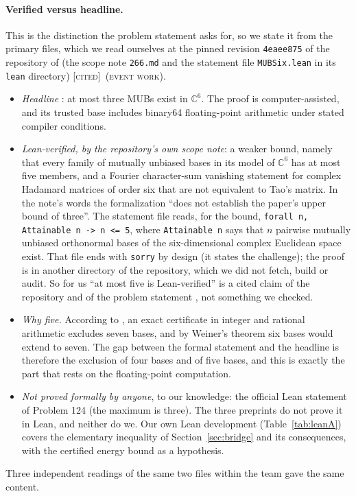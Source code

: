 \documentclass[11pt]{article}
\newcommand{\C}{\mathbb{C}}
\newcommand{\st}[1]{\textsc{[#1]}}
\newcommand{\stcited}{\st{cited}}
\newcommand{\event}{\textsc{(event work)}}
\theoremstyle{definition}
\theoremstyle{remark}
\begin{document}
\paragraph{Verified versus headline.} This is the distinction the problem statement asks for, so we state it from
the primary files, which we read ourselves at the pinned revision \texttt{4eaee875} of the repository of \cite{OAI}
(the scope note \texttt{266.md} and the statement file \texttt{MUBSix.lean} in its \texttt{lean} directory)
\stcited\ \event.
\begin{itemize}
\item \emph{Headline} \cite{OAI}: at most three MUBs exist in $\C^6$. The proof is computer-assisted, and its
trusted base includes binary64 floating-point arithmetic under stated compiler conditions.
\item \emph{Lean-verified, by the repository's own scope note}: a weaker bound, namely that every family of
mutually unbiased bases in its model of $\C^6$ has at most five members, and a Fourier character-sum vanishing
statement for complex Hadamard matrices of order six that are not equivalent to Tao's matrix. In the note's words
the formalization ``does not establish the paper's upper bound of three''. The statement file reads, for the bound,
\texttt{forall n, Attainable n -> n <= 5}, where \texttt{Attainable n} says that $n$ pairwise mutually unbiased
orthonormal bases of the six-dimensional complex Euclidean space exist. That file ends with \texttt{sorry} by
design (it states the challenge); the proof is in another directory of the repository, which we did not fetch,
build or audit. So for us ``at most five is Lean-verified'' is a cited claim of the repository and of the problem
statement \cite{Sheet}, not something we checked.
\item \emph{Why five.} According to \cite{Sheet}, an exact certificate in integer and rational arithmetic excludes
seven bases, and by Weiner's theorem \cite{Weiner13} six bases would extend to seven. The gap between the formal
statement and the headline is therefore the exclusion of four bases and of five bases, and this is exactly the
part that rests on the floating-point computation.
\item \emph{Not proved formally by anyone}, to our knowledge: the official Lean statement of Problem 124 (the
maximum is three). The three preprints do not prove it in Lean, and neither do we. Our own Lean development
(Table~\ref{tab:leanA}) covers the elementary inequality of Section~\ref{sec:bridge} and its consequences, with
the certified energy bound as a hypothesis.
\end{itemize}
Three independent readings of the same two files within the team gave the same content.
\end{document}
